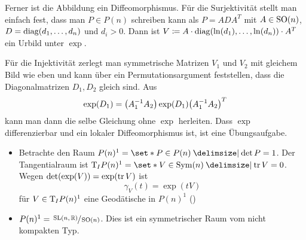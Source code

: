 Ferner ist die Abbildung
ein Diffeomorphismus.
Für die Surjektivität stellt man einfach fest, dass man $P \in P(n)$ schreiben kann als 
$P  = A D A^T$ mit $A \in \operatorname{SO}(n)$, $D = \operatorname{diag}(d_1, \ldots ,d_n)$ und $d_i >0$.
Dann ist $V \coloneqq A \cdot \operatorname{diag}(\ln(d_1), \ldots , \ln(d_n)) \cdot A^T$ ein Urbild unter $\exp$.

Für die Injektivität zerlegt man symmetrische Matrizen $V_1$ und $V_2$ mit gleichem Bild wie eben und kann über ein Permutationsargument feststellen, dass die Diagonalmatrizen $D_1, D_2$  gleich sind.
Aus 
\[
	\exp(D_1) = \enbrace*{A_1^{-1} A_2} \exp(D_1) \enbrace*{A_1^{-1} A_2}^T
\]
kann man dann die selbe Gleichung ohne $\exp$ herleiten.
Dass $\exp$ differenzierbar und ein lokaler Diffeomorphismus ist, ist eine Übungsaufgabe.

\begin{bemerkung*}[{name=[Teilmenge der positiv definiten Matrizen]}]
	\begin{itemize}
		\item Betrachte den Raum $P(n)^1 = \set*{P \in P(n) \given \det P = 1}$. 
		Der Tangentialraum ist $\Tmap_I P(n)^1 = \set*{V \in \Sym(n) \given \tr V =0}$.
		Wegen $\det \enbrace*{\exp (V)} = \exp (\tr V)$ ist
		\[
			\gamma_V(t) = \exp(t V) 
		\]
		für $V \in \mathrm{T}\mkern-0.85mu_I P(n)^1$ eine Geodätische in $P(n)^1$ ()
		\item $P(n)^1 = \sfrac{\operatorname{SL}(n,\mathbb{R})}{\operatorname{SO}(n)}$. Dies ist ein symmetrischer Raum vom nicht kompakten Typ.
	\end{itemize}
\end{bemerkung*}

